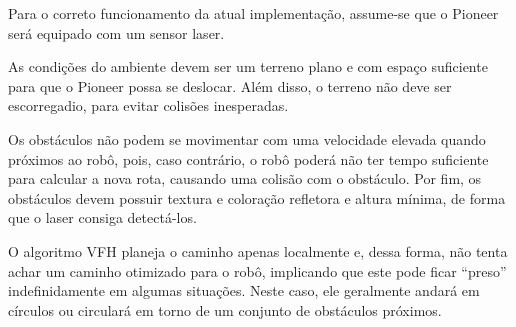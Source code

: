 Para o correto funcionamento da atual implementação, assume-se que o Pioneer 
será equipado com um sensor laser.

As condições do ambiente devem ser um terreno plano e com espaço suficiente para que o Pioneer possa se 
deslocar. Além disso, o terreno não deve ser escorregadio, para evitar colisões inesperadas. 
 
Os obstáculos não podem se movimentar com uma velocidade elevada quando próximos ao robô, pois, caso contrário, o robô poderá não ter tempo suficiente para calcular a nova rota, causando uma colisão com o obstáculo. 
Por fim, os obstáculos devem possuir textura e coloração refletora e altura mínima, de forma que o laser consiga detectá-los.

O algoritmo VFH planeja o caminho apenas localmente e, dessa forma, 
não tenta achar um caminho otimizado para o robô, implicando que este pode 
ficar “preso” indefinidamente em algumas situações. Neste caso, ele geralmente andará em círculos ou 
circulará em torno de um conjunto de obstáculos próximos.
